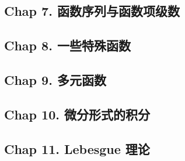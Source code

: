 \subsection{Chap 7. 函数序列与函数项级数}

\subsection{Chap 8. 一些特殊函数}

\subsection{Chap 9. 多元函数}

\subsection{Chap 10. 微分形式的积分}

\subsection{Chap 11. Lebesgue 理论}
